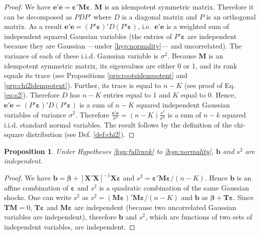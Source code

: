\documentclass[
  12pt,
]{book}
\newtheorem{proposition}{Proposition}[chapter]
\theoremstyle{definition}
\theoremstyle{definition}
\theoremstyle{definition}
\theoremstyle{definition}
\theoremstyle{remark}
\begin{document}
\begin{proof}
We have \(\mathbf{e}'\mathbf{e}=\boldsymbol\varepsilon'\mathbf{M}\boldsymbol\varepsilon\). \(\mathbf{M}\) is an idempotent symmetric matrix. Therefore it can be decomposed as \(PDP'\) where \(D\) is a diagonal matrix and \(P\) is an orthogonal matrix. As a result \(\mathbf{e}'\mathbf{e} = (P'\boldsymbol\varepsilon)'D(P'\boldsymbol\varepsilon)\), i.e.~\(\mathbf{e}'\mathbf{e}\) is a weighted sum of independent squared Gaussian variables (the entries of \(P'\boldsymbol\varepsilon\) are independent because they are Gaussian ---under \ref{hyp:normality}--- and uncorrelated). The variance of each of these i.i.d. Gaussian variable is \(\sigma^2\). Because \(\mathbf{M}\) is an idempotent symmetric matrix, its eigenvalues are either 0 or 1, and its rank equals its trace (see Propositions \ref{prp:rootsidempotent} and \ref{prp:chi2idempotent}). Further, its trace is equal to \(n-K\) (see proof of Eq. \eqref{eq:s2}). Therefore \(D\) has \(n-K\) entries equal to 1 and \(K\) equal to 0. Hence, \(\mathbf{e}'\mathbf{e} = (P'\boldsymbol\varepsilon)'D(P'\boldsymbol\varepsilon)\) is a sum of \(n-K\) squared independent Gaussian variables of variance \(\sigma^2\). Therefore \(\frac{\mathbf{e}'\mathbf{e}}{\sigma^2} = (n-K)\frac{s^2}{\sigma^2}\) is a sum of \(n-k\) squared i.i.d. standard normal variables. The result follows by the definition of the chi-square distribution (see Def. \ref{def:chi2}).
\end{proof}

\begin{proposition}
\protect\hypertarget{prp:indeps2b}{}\label{prp:indeps2b}Under Hypotheses \ref{hyp:fullrank} to \ref{hyp:normality}, \(\mathbf{b}\) and \(s^2\) are independent.
\end{proposition}

\begin{proof}
We have \(\mathbf{b}=\boldsymbol\beta + [\mathbf{X}'{\mathbf{X}}]^{-1}\mathbf{X}\boldsymbol\varepsilon\) and \(s^2 = \boldsymbol\varepsilon' \mathbf{M} \boldsymbol\varepsilon/(n-K)\). Hence \(\mathbf{b}\) is an affine combination of \(\boldsymbol\varepsilon\) and \(s^2\) is a quadratic combination of the same Gaussian shocks. One can write \(s^2\) as \(s^2 = (\mathbf{M}\boldsymbol\varepsilon)' \mathbf{M} \boldsymbol\varepsilon/(n-K)\) and \(\mathbf{b}\) as \(\boldsymbol\beta + \mathbf{T}\boldsymbol\varepsilon\). Since \(\mathbf{T}\mathbf{M}=0\), \(\mathbf{T}\boldsymbol\varepsilon\) and \(\mathbf{M}\boldsymbol\varepsilon\) are independent (because two uncorrelated Gaussian variables are independent), therefore \(\mathbf{b}\) and \(s^2\), which are functions of two sets of independent variables, are independent.
\end{proof}
\end{document}

